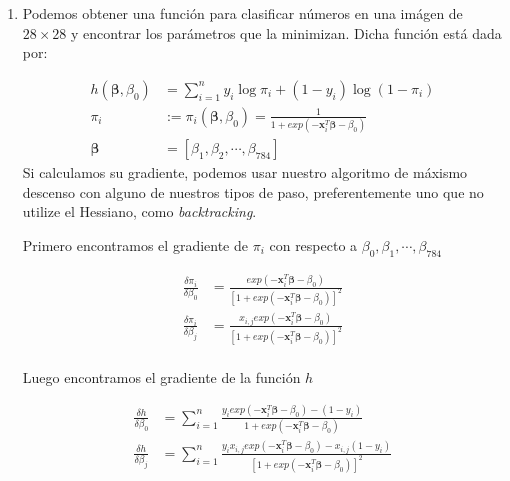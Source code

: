 \documentclass[10pt,twocolumn]{article}
\begin{document}
\begin{enumerate}
\begin{table}[h]
\centering
\label{wood2}
\end{table}

\item Podemos obtener una función para clasificar números en una imágen de $28 \times 28$ y encontrar los parámetros que la minimizan. Dicha función está dada por:


\begin{align*} 
h(\boldsymbol{\beta}, \beta_0) &= \sum_{i=1}^{n}y_i \log\pi_i + (1 - y_i)\log(1 - \pi_i)\\
\pi_i &:= \pi_i(\boldsymbol{\beta}, \beta_0)  = \frac{1}{1+exp(-\boldsymbol{x}_i^T\boldsymbol{\beta} - \beta_0)}\\
\boldsymbol{\beta} &= [\beta_1, \beta_2, \cdots, \beta_{784}]
\end{align*}
Si calculamos su gradiente, podemos usar nuestro algoritmo de máxismo descenso con alguno de nuestros tipos de paso, preferentemente uno que no utilize el Hessiano, como \emph{backtracking}.

Primero encontramos el gradiente de $\pi_i$ con respecto a $\beta_0, \beta_1, \cdots, \beta_{784}$

\begin{align*} 
\frac{\delta\pi_i}{\delta\beta_0} &= \frac{exp(-\boldsymbol{x}_i^T\boldsymbol{\beta}-\beta_0)}{[1 + exp(-\boldsymbol{x}_i^T\boldsymbol{\beta}-\beta_0)]^2}\\
\frac{\delta\pi_i}{\delta\beta_j} &= \frac{x_{i,j}exp(-\boldsymbol{x}_i^T\boldsymbol{\beta}-\beta_0)}{[1 + exp(-\boldsymbol{x}_i^T\boldsymbol{\beta}-\beta_0)]^2}\\
\end{align*}

\newpage
Luego encontramos el gradiente de la función $h$


\begin{align*} 
\frac{\delta h}{\delta\beta_0} &= \sum_{i=1}^{n}\frac{y_i exp(-\boldsymbol{x}_i^T\boldsymbol{\beta}-\beta_0) - (1-y_i)}{1 + exp(-\boldsymbol{x}_i^T\boldsymbol{\beta}-\beta_0)}\\
\frac{\delta h}{\delta\beta_j} &= \sum_{i=1}^{n}\frac{y_ix_{i,j}exp(-\boldsymbol{x}_i^T\boldsymbol{\beta}-\beta_0) - x_{i,j}(1-y_i)}{[1 + exp(-\boldsymbol{x}_i^T\boldsymbol{\beta}-\beta_0)]^2}\\
\end{align*}


\end{enumerate}
\end{document}
